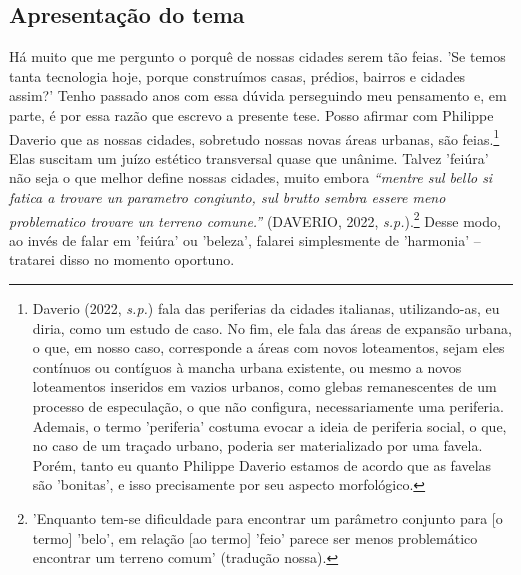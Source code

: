 \documentclass[twoside, 12pt, english,italian,latin,greek,french,spanish,brazil]{book}
\begin{document}


    \subsection{Apresentação do tema}	

    Há muito que me pergunto o porquê de nossas cidades serem tão feias. 'Se temos tanta tecnologia hoje, porque construímos casas, prédios, bairros e cidades assim?' Tenho passado anos com essa dúvida perseguindo meu pensamento e, em parte, é por essa razão que escrevo a presente tese. Posso afirmar com Philippe Daverio que as nossas cidades, sobretudo nossas novas áreas urbanas, são feias.\footnote[1]{Daverio (2022, \textit{s.p.}) fala das periferias da cidades italianas, utilizando-as, eu diria, como um estudo de caso. No fim, ele fala das áreas de expansão urbana, o que, em nosso caso, corresponde a áreas com novos loteamentos, sejam eles contínuos ou contíguos à mancha urbana existente, ou mesmo a novos loteamentos inseridos em vazios urbanos, como glebas remanescentes de um processo de especulação, o que não configura, necessariamente uma periferia. Ademais, o termo 'periferia' costuma evocar a ideia de periferia social, o que, no caso de um traçado urbano, poderia ser materializado por uma favela. Porém, tanto eu quanto Philippe Daverio %
     estamos de acordo que as favelas são 'bonitas', e isso precisamente por seu aspecto morfológico.} Elas suscitam um juízo estético transversal quase que unânime. Talvez 'feiúra' não seja o que melhor define nossas cidades, muito embora \textit{“mentre sul bello si fatica a trovare un parametro congiunto, sul brutto sembra essere meno problematico trovare un terreno comune.”} (DAVERIO, 2022, \textit{s.p.}).\footnote[2]{'Enquanto tem-se dificuldade para encontrar um parâmetro conjunto para [o termo] 'belo', em relação [ao termo] 'feio' parece ser menos problemático encontrar um terreno comum' (tradução nossa).} Desse modo, ao invés de falar em 'feiúra' ou 'beleza', falarei simplesmente de 'harmonia' – tratarei disso no momento oportuno.
     
\end{document}
